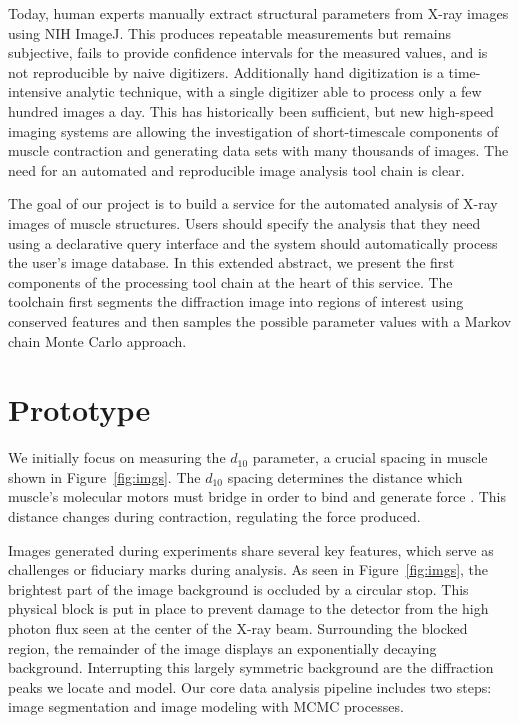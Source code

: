 \documentclass{sig-alternate}
\begin{document}
Today, human experts manually extract structural parameters
from X-ray images using NIH ImageJ. This produces repeatable
measurements but remains subjective, fails to provide confidence
intervals for the measured values, and is not reproducible by naive
digitizers. Additionally hand digitization is a time-intensive
analytic technique, with a single digitizer able to process only a few
hundred images a day.  This has historically been sufficient, but new
high-speed imaging systems are allowing the investigation of
short-timescale components of muscle contraction and generating data
sets with many thousands of images. The need for an automated and
reproducible image analysis tool chain is clear. 

The goal of our project is to build a service for the automated
analysis of X-ray images of muscle structures.  Users should specify
the analysis that they need using a declarative query interface and
the system should automatically process the user's image database.  In
this extended abstract, we present the first components of the
processing tool chain at the heart of this service. The toolchain
first segments the diffraction image into regions of interest using
conserved features and then samples the possible parameter values with
a Markov chain Monte Carlo approach.


\section{Prototype}
\label{sec:proto}


We initially focus on measuring the $d_{10}$ parameter, a crucial
spacing in muscle shown in Figure~\ref{fig:imgs}. The $d_{10}$ spacing
determines the distance which muscle's molecular motors must bridge in
order to bind and generate force \cite{Williams2013}. This distance
changes during contraction, regulating the force produced.

Images generated during experiments share several key features, which
serve as challenges or fiduciary marks during analysis. As seen in
Figure~\ref{fig:imgs}, the brightest part of the image background is
occluded by a circular stop. This physical block is put in place to
prevent damage to the detector from the high photon flux seen at the
center of the X-ray beam. Surrounding the blocked region, the
remainder of the image displays an exponentially decaying background.
Interrupting this largely symmetric background are the diffraction
peaks we locate and model.  Our core data analysis pipeline includes
two steps: image segmentation and image modeling with MCMC processes.
\end{document}
